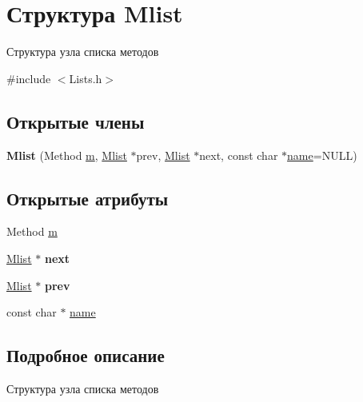 \hypertarget{structMlist}{}\section{Структура Mlist}
\label{structMlist}


Структура узла списка методов  




{\ttfamily \#include $<$Lists.\+h$>$}

\subsection*{Открытые члены}
\begin{DoxyCompactItemize}
\item 
\mbox{\label{structMlist_a30a7239396e552742e9be48a111dd101}} 
{\bfseries Mlist} (Method \mbox{\hyperlink{structMlist_a0569033e58c295d725966143d61f4aa9}{m}}, \mbox{\hyperlink{structMlist}{Mlist}} $\ast$prev, \mbox{\hyperlink{structMlist}{Mlist}} $\ast$next, const char $\ast$\mbox{\hyperlink{structMlist_a4e0e04a40166dabf1343872f3466cf7a}{name}}=N\+U\+LL)
\end{DoxyCompactItemize}
\subsection*{Открытые атрибуты}
\begin{DoxyCompactItemize}
\item 
Method \mbox{\hyperlink{structMlist_a0569033e58c295d725966143d61f4aa9}{m}}
\item 
\mbox{\label{structMlist_acf1da0d9e7638cc25ca93a55180300e6}} 
\mbox{\hyperlink{structMlist}{Mlist}} $\ast$ {\bfseries next}
\item 
\mbox{\label{structMlist_a9acf0dd7d99083249fbe5249db2a4317}} 
\mbox{\hyperlink{structMlist}{Mlist}} $\ast$ {\bfseries prev}
\item 
const char $\ast$ \mbox{\hyperlink{structMlist_a4e0e04a40166dabf1343872f3466cf7a}{name}}
\end{DoxyCompactItemize}


\subsection{Подробное описание}
Структура узла списка методов 

